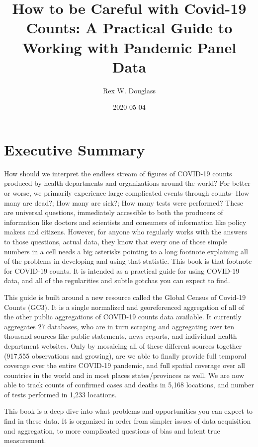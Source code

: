 \documentclass[
]{book}
\title{How to be Careful with Covid-19 Counts: A Practical Guide to Working with Pandemic Panel Data}
\author{Rex W. Douglass}
\date{2020-05-04}
\begin{document}
\maketitle

{
\setcounter{tocdepth}{1}
\tableofcontents
}
\hypertarget{index}{%
\chapter{Executive Summary}\label{index}}

How should we interpret the endless stream of figures of COVID-19 counts produced by health departments and organizations around the world? For better or worse, we primarily experience large complicated events through counts- How many are dead?; How many are sick?; How many tests were performed? These are universal questions, immediately accessible to both the producers of information like doctors and scientists and consumers of information like policy makers and citizens. However, for anyone who regularly works with the answers to those questions, actual data, they know that every one of those simple numbers in a cell needs a big asterisks pointing to a long footnote explaining all of the problems in developing and using that statistic. This book is that footnote for COVID-19 counts. It is intended as a practical guide for using COVID-19 data, and all of the regularities and subtle gotchas you can expect to find.

This guide is built around a new resource called the Global Census of Covid-19 Counts (GC3). It is a single normalized and georeferenced aggregation of all of the other public aggregations of COVID-19 counts data available. It currently aggregates 27 databases, who are in turn scraping and aggregating over ten thousand sources like public statements, news reports, and individual health department websites. Only by mosaicing all of these different sources together (917,555 observations and growing), are we able to finally provide full temporal coverage over the entire COVID-19 pandemic, and full spatial coverage over all countries in the world and in most places states/provinces as well. We are now able to track counts of confirmed cases and deaths in 5,168 locations, and number of tests performed in 1,233 locations.

This book is a deep dive into what problems and opportunities you can expect to find in these data. It is organized in order from simpler issues of data acquisition and aggregation, to more complicated questions of bias and latent true measurement.
\end{document}
